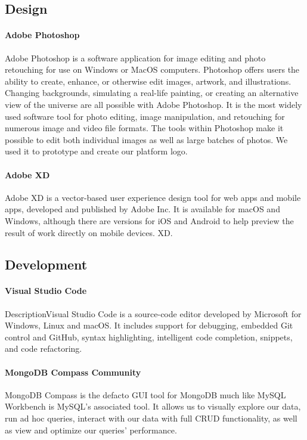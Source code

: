 \subsection{Design}
\paragraph{Adobe Photoshop}
Adobe Photoshop is a software application for image editing and photo retouching for use on Windows or MacOS computers. Photoshop offers users the ability to create, enhance, or otherwise edit images, artwork, and illustrations. Changing backgrounds, simulating a real-life painting, or creating an alternative view of the universe are all possible with Adobe Photoshop. It is the most widely used software tool for photo editing, image manipulation, and retouching for numerous image and video file formats. The tools within Photoshop make it possible to edit both individual images as well as large batches of photos.
We used it to prototype and create our platform logo.
\paragraph{Adobe XD}
Adobe XD is a vector-based user experience design tool for web apps and mobile apps, developed and published by Adobe Inc. It is available for macOS and Windows, although there are versions for iOS and Android to help preview the result of work directly on mobile devices. XD.












\subsection{Development}
\paragraph{Visual Studio Code}
DescriptionVisual Studio Code is a source-code editor developed by Microsoft for Windows, Linux and macOS. It includes support for debugging, embedded Git control and GitHub, syntax highlighting, intelligent code completion, snippets, and code refactoring.


\paragraph{MongoDB Compass Community}
MongoDB Compass is the defacto GUI tool for MongoDB much like MySQL Workbench is MySQL’s associated tool. It allows us to visually explore our data, run ad hoc queries, interact with our data with full CRUD functionality, as well as view and optimize our queries’ performance.



